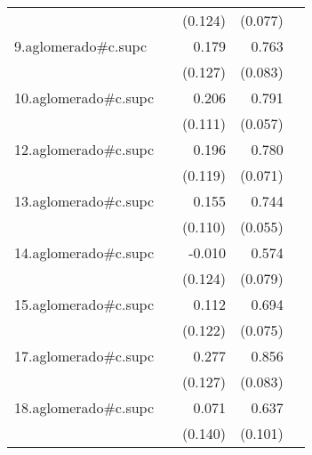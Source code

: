 {\begin{longtable}{l*{4}{D{.}{.}{-1}}}
            &                     &     (0.124)         &     (0.077)         &                     \\
\addlinespace
9.aglomerado#c.supc&                     &       0.179         &       0.763\sym{***}&                     \\
            &                     &     (0.127)         &     (0.083)         &                     \\
\addlinespace
10.aglomerado#c.supc&                     &       0.206         &       0.791\sym{***}&                     \\
            &                     &     (0.111)         &     (0.057)         &                     \\
\addlinespace
12.aglomerado#c.supc&                     &       0.196         &       0.780\sym{***}&                     \\
            &                     &     (0.119)         &     (0.071)         &                     \\
\addlinespace
13.aglomerado#c.supc&                     &       0.155         &       0.744\sym{***}&                     \\
            &                     &     (0.110)         &     (0.055)         &                     \\
\addlinespace
14.aglomerado#c.supc&                     &      -0.010         &       0.574\sym{***}&                     \\
            &                     &     (0.124)         &     (0.079)         &                     \\
\addlinespace
15.aglomerado#c.supc&                     &       0.112         &       0.694\sym{***}&                     \\
            &                     &     (0.122)         &     (0.075)         &                     \\
\addlinespace
17.aglomerado#c.supc&                     &       0.277\sym{*}  &       0.856\sym{***}&                     \\
            &                     &     (0.127)         &     (0.083)         &                     \\
\addlinespace
18.aglomerado#c.supc&                     &       0.071         &       0.637\sym{***}&                     \\
            &                     &     (0.140)         &     (0.101)         &                     \\

\end{longtable}}
